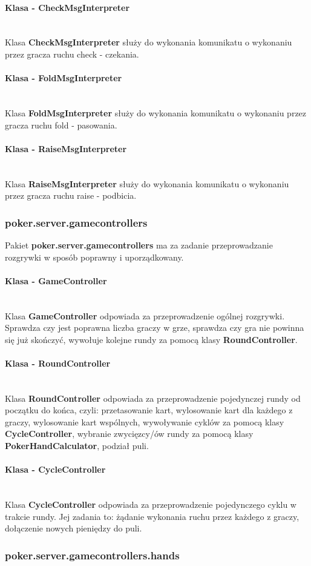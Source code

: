 \documentclass{article}
\newcommand{\mparagraph}[1]{\paragraph{#1}\mbox{}\vspace{2mm}\\}
\begin{document}
            \mparagraph{Klasa - CheckMsgInterpreter}
                Klasa \textbf{CheckMsgInterpreter} służy do wykonania komunikatu o wykonaniu przez gracza ruchu check - czekania.
                
            \mparagraph{Klasa - FoldMsgInterpreter}
                Klasa \textbf{FoldMsgInterpreter} służy do wykonania komunikatu o wykonaniu przez gracza ruchu fold - pasowania.
                
            \mparagraph{Klasa - RaiseMsgInterpreter}
                Klasa \textbf{RaiseMsgInterpreter} służy do wykonania komunikatu o wykonaniu przez gracza ruchu raise - podbicia.
    
        \subsubsection{poker.server.gamecontrollers}
            Pakiet \textbf{poker.server.gamecontrollers} ma za zadanie przeprowadzanie rozgrywki w sposób poprawny i uporządkowany.
            
            \mparagraph{Klasa - GameController}
                Klasa \textbf{GameController} odpowiada za przeprowadzenie ogólnej rozgrywki.
                Sprawdza czy jest poprawna liczba graczy w grze, sprawdza czy gra nie powinna się już skończyć, wywołuje kolejne rundy za pomocą klasy \textbf{RoundController}.
                
            \mparagraph{Klasa - RoundController}
                Klasa \textbf{RoundController} odpowiada za przeprowadzenie pojedynczej rundy od początku do końca, czyli: przetasowanie kart, wylosowanie kart dla każdego z graczy, wylosowanie kart wspólnych, wywoływanie cyklów za pomocą klasy \textbf{CycleController}, wybranie zwycięzcy/ów rundy za pomocą klasy \textbf{PokerHandCalculator}, podział puli.
                
            \mparagraph{Klasa - CycleController}
                Klasa \textbf{CycleController} odpowiada za przeprowadzenie pojedynczego cyklu w trakcie rundy.
                Jej zadania to: żądanie wykonania ruchu przez każdego z graczy, dołączenie nowych pieniędzy do puli.
                
        \subsubsection{poker.server.gamecontrollers.hands}
        
\end{document}
